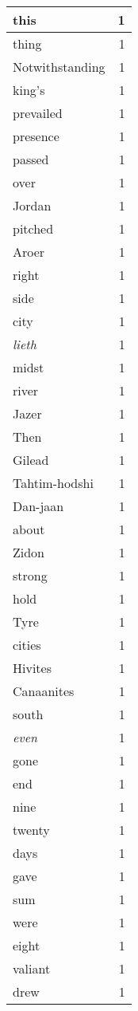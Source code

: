 \begin{center}
\begin{longtable}{l|r}
this & 1 \\ \hline
thing & 1 \\ \hline
Notwithstanding & 1 \\ \hline
king's & 1 \\ \hline
prevailed & 1 \\ \hline
presence & 1 \\ \hline
passed & 1 \\ \hline
over & 1 \\ \hline
Jordan & 1 \\ \hline
pitched & 1 \\ \hline
Aroer & 1 \\ \hline
right & 1 \\ \hline
side & 1 \\ \hline
city & 1 \\ \hline
\emph{lieth} & 1 \\ \hline
midst & 1 \\ \hline
river & 1 \\ \hline
Jazer & 1 \\ \hline
Then & 1 \\ \hline
Gilead & 1 \\ \hline
Tahtim-hodshi & 1 \\ \hline
Dan-jaan & 1 \\ \hline
about & 1 \\ \hline
Zidon & 1 \\ \hline
strong & 1 \\ \hline
hold & 1 \\ \hline
Tyre & 1 \\ \hline
cities & 1 \\ \hline
Hivites & 1 \\ \hline
Canaanites & 1 \\ \hline
south & 1 \\ \hline
\emph{even} & 1 \\ \hline
gone & 1 \\ \hline
end & 1 \\ \hline
nine & 1 \\ \hline
twenty & 1 \\ \hline
days & 1 \\ \hline
gave & 1 \\ \hline
sum & 1 \\ \hline
were & 1 \\ \hline
eight & 1 \\ \hline
valiant & 1 \\ \hline
drew & 1 \\ \hline

\end{longtable}
\end{center}
